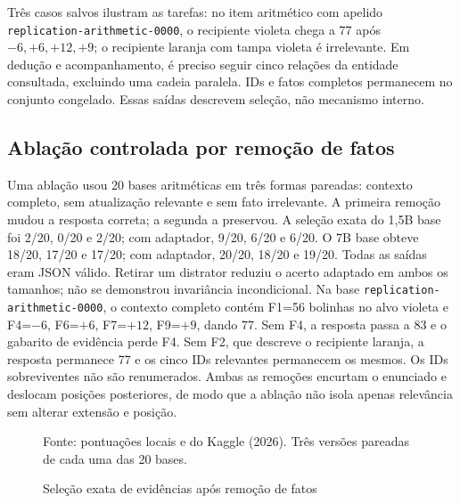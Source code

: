 \documentclass[12pt,a4paper]{article}
\begin{document}
Três casos salvos ilustram as tarefas: no item aritmético com apelido \nolinkurl{replication-arithmetic-0000}, o recipiente violeta chega a 77 após $-6,+6,+12,+9$; o recipiente laranja com tampa violeta é irrelevante. Em dedução e acompanhamento, é preciso seguir cinco relações da entidade consultada, excluindo uma cadeia paralela. IDs e fatos completos permanecem no conjunto congelado. Essas saídas descrevem seleção, não mecanismo interno.

\subsection{Ablação controlada por remoção de fatos}
Uma ablação usou 20 bases aritméticas em três formas pareadas: contexto completo, sem atualização relevante e sem fato irrelevante. A primeira remoção mudou a resposta correta; a segunda a preservou. A seleção exata do 1,5B base foi 2/20, 0/20 e 2/20; com adaptador, 9/20, 6/20 e 6/20. O 7B base obteve 18/20, 17/20 e 17/20; com adaptador, 20/20, 18/20 e 19/20. Todas as saídas eram JSON válido. Retirar um distrator reduziu o acerto adaptado em ambos os tamanhos; não se demonstrou invariância incondicional. Na base \nolinkurl{replication-arithmetic-0000}, o contexto completo contém F1=56 bolinhas no alvo violeta e F4=$-6$, F6=$+6$, F7=$+12$, F9=$+9$, dando 77. Sem F4, a resposta passa a 83 e o gabarito de evidência perde F4. Sem F2, que descreve o recipiente laranja, a resposta permanece 77 e os cinco IDs relevantes permanecem os mesmos. Os IDs sobreviventes não são renumerados. Ambas as remoções encurtam o enunciado e deslocam posições posteriores, de modo que a ablação não isola apenas relevância sem alterar extensão e posição.

\begin{figure}[htbp]\centering\caption{Seleção exata de evidências após remoção de fatos}\label{fig:ablation}\par{\fontsize{10}{12}\selectfont Fonte: pontuações locais e do Kaggle (2026). Três versões pareadas de cada uma das 20 bases.\par}\end{figure}
\end{document}
